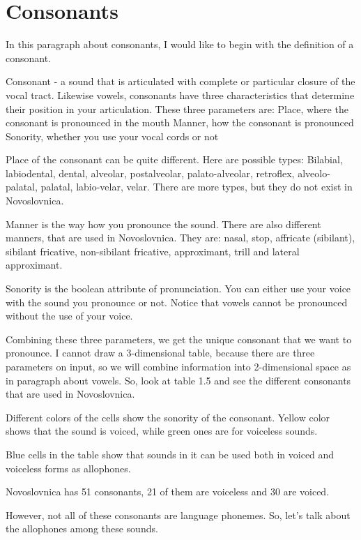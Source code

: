 \section{Consonants}

In this paragraph about consonants, I would like to begin with the definition of a consonant.

Consonant - a sound that is articulated with complete or particular closure of the vocal tract. 
Likewise vowels, consonants have three characteristics that determine their position in your articulation. These three parameters are:
Place, where the consonant is pronounced in the mouth
Manner, how the consonant is pronounced 
Sonority, whether you use your vocal cords or not

Place of the consonant can be quite different. Here are possible types: Bilabial, labiodental, dental, alveolar, postalveolar, palato-alveolar, retroflex, alveolo-palatal, palatal, labio-velar, velar. There are more types, but they do not exist in Novoslovnica.

Manner is the way how you pronounce the sound. There are also different manners, that are used in Novoslovnica. They are: nasal, stop, affricate (sibilant), sibilant fricative, non-sibilant fricative, approximant, trill and lateral approximant.

Sonority is the boolean attribute of pronunciation. You can either use your voice with the sound you pronounce or not. Notice that vowels cannot be pronounced without the use of your voice. 

Combining these three parameters, we get the unique consonant that we want to pronounce. I cannot draw  a 3-dimensional table, because there are three parameters on input, so we will combine information into 2-dimensional space as in paragraph about vowels. So, look at table 1.5 and see the different consonants that are used in Novoslovnica.



Different colors of the cells show the sonority of the consonant. Yellow color shows that the sound is voiced, while green ones are for voiceless sounds.

Blue cells in the table show that sounds in it can be used both in voiced and voiceless forms as allophones.

Novoslovnica has 51 consonants, 21 of them are voiceless and 30 are voiced.

However, not all of these consonants are language phonemes. So, let’s talk about the allophones among these sounds.